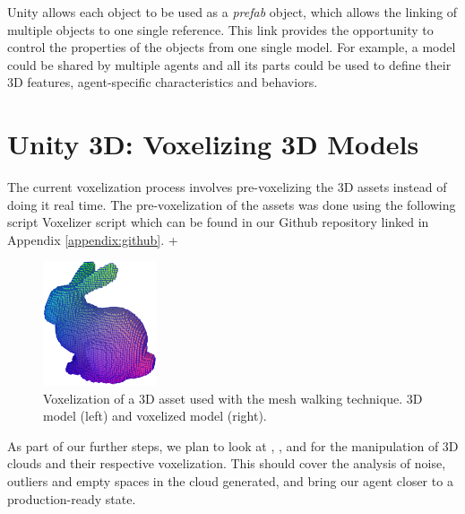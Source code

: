 Unity allows each object to be used as a \textit{prefab} object, which allows the linking of multiple objects to one single reference. This link provides the opportunity to control the properties of the objects from one single model. For example, a model could be shared by multiple agents and all its parts could be used to define their 3D features, agent-specific characteristics and behaviors.




\newpage

\section{Unity 3D: Voxelizing 3D Models}\label{appendix:unity3d-voxelizing-3dmodels}
The current voxelization process involves pre-voxelizing the 3D assets instead of doing it real time. The pre-voxelization of the assets was done using the following script Voxelizer script which can be found in our Github repository linked in Appendix \ref{appendix:github}.
+\begin{figure}[!ht]
        \centering
        \includegraphics[width=0.3\textwidth]{images/voxel_bunny_borders.png}
        \caption{Voxelization of a 3D asset used with the mesh walking technique. 3D model (left) and voxelized model (right). 
        }
        \label{fig:unity-voxelized}
\end{figure}


As part of our further steps, we plan to look at \cite{weder2020routedfusion}, \cite{ravi2020pytorch3d}, \cite{googleAI2022tensorflow3D, najibi2020dops} and \cite{hackel2017semantic3d} for the manipulation of 3D clouds and their respective voxelization. This should cover the analysis of noise, outliers and empty spaces in the cloud generated, and bring our agent closer to a production-ready state.


